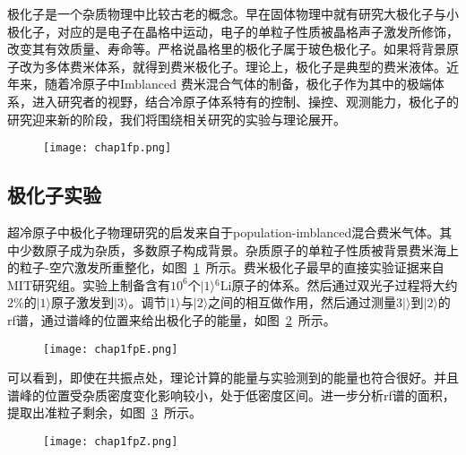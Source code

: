 极化子是一个杂质物理中比较古老的概念。早在固体物理中就有研究大极化子与小极化子\cite{landau1933bewegung,pekar1946autolocalization,frohlich1950xx,frohlich1954electrons,feynman1955slow,mahanmany}，对应的是电子在晶格中运动，电子的单粒子性质被晶格声子激发所修饰，改变其有效质量、寿命等。严格说晶格里的极化子属于玻色极化子。如果将背景原子改为多体费米体系，就得到费米极化子。理论上，极化子是典型的费米液体。近年来，随着冷原子中Imblanced 费米混合气体的制备，极化子作为其中的极端体系，进入研究者的视野，结合冷原子体系特有的控制、操控、观测能力，极化子的研究迎来新的阶段，我们将围绕相关研究的实验与理论展开。
\begin{figure}[!htbp]
    \centering
    \texttt{[image: chap1fp.png]}
    \label{fp}
\end{figure}

\subsection{极化子实验}
超冷原子中极化子物理研究的启发来自于population-imblanced混合费米气体。其中少数原子成为杂质，多数原子构成背景。杂质原子的单粒子性质被背景费米海上的粒子-空穴激发所重整化，如图~\ref{fp}~所示。费米极化子最早的直接实验证据来自MIT研究组\cite{Schirotzekobservation}。实验上制备含有$10^6$个$|1\rangle{}^6$Li原子的体系。然后通过双光子过程将大约$2\%$的$|1\rangle$原子激发到$|3\rangle$。调节$|1\rangle$与$|2\rangle$之间的相互做作用，然后通过测量$3|\rangle$到$|2\rangle$的rf谱，通过谱峰的位置来给出极化子的能量，如图~\ref{fpE}~所示。
\begin{figure}[!htbp]
    \centering
    \texttt{[image: chap1fpE.png]}
    \label{fpE}
\end{figure}

可以看到，即使在共振点处，理论计算的能量与实验测到的能量也符合很好。并且谱峰的位置受杂质密度变化影响较小，处于低密度区间。进一步分析rf谱的面积，提取出准粒子剩余，如图~\ref{fpZ}~所示。
\begin{figure}[!htbp]
    \centering
    \texttt{[image: chap1fpZ.png]}
    \label{fpZ}
\end{figure}


